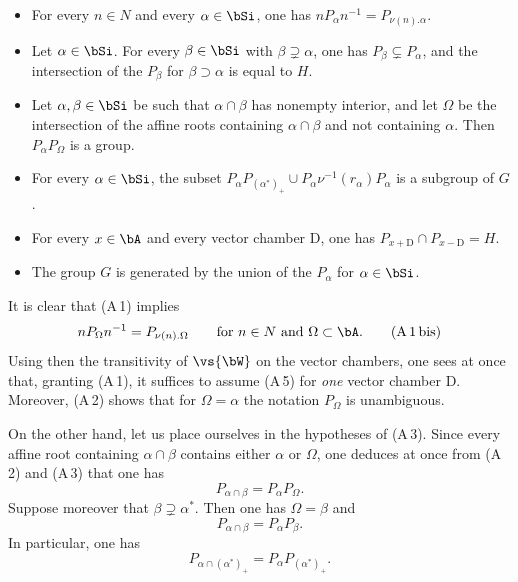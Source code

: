 \documentclass[12pt,a4paper,oneside,english]{smfart}
\makeatletter
\newcommand{\btanchor}[1]{\leavevmode\Hy@raisedlink{\hypertarget{bt:#1}{}}}
\theoremstyle{definition}
\theoremstyle{bt}
\makeatother
\begin{document}
\medskip
\begin{itemize}\itshape
\item[(A\,1)] For every $n\in N$ and every $\alpha\in\bSi$, one has
$nP_{\alpha}n^{-1}=P_{\nu(n).\alpha}$.
\item[(A\,2)] Let $\alpha\in\bSi$. For every $\beta\in\bSi$ with
$\beta\supsetneq\alpha$, one has $P_{\beta}\subsetneq P_{\alpha}$, and the
intersection of the $P_{\beta}$ for $\beta\supset\alpha$ is equal to $H$.
\item[(A\,3)] Let $\alpha,\beta\in\bSi$ be such that $\alpha\cap\beta$ has
nonempty interior, and let $\Omega$ be the intersection of the affine roots
containing $\alpha\cap\beta$ and not containing $\alpha$. Then
$P_{\alpha}P_{\Omega}$ is a group.
\item[(A\,4)] For every $\alpha\in\bSi$, the subset
$P_{\alpha}P_{(\alpha^{*})_{+}}\cup P_{\alpha}\nu^{-1}(r_{\alpha})P_{\alpha}$
is a subgroup of $G$.
\item[(A\,5)] For every $x\in\bA$ and every vector chamber $\mathrm{D}$, one has
$P_{x+\mathrm{D}}\cap P_{x-\mathrm{D}}=H$.
\item[(A\,6)] The group $G$ is generated by the union of the $P_{\alpha}$ for
$\alpha\in\bSi$.
\end{itemize}

\btanchor{5.2.2}
It is clear that (A\,1) implies
\begin{equation*}
nP_{\Omega}n^{-1}=P_{\nu(n).\Omega}\qquad\text{for } n\in N\text{ and }\Omega\subset\bA.
\tag{A\,1\,bis}
\end{equation*}
Using then the transitivity of $\vs{\bW}$ on the vector chambers, one sees at
once that, granting (A\,1), it suffices to assume (A\,5) for \emph{one} vector
chamber $\mathrm{D}$. Moreover, (A\,2) shows that for $\Omega=\alpha$ the
notation $P_{\Omega}$ is unambiguous.

On the other hand, let us place ourselves in the hypotheses of (A\,3). Since
every affine root containing $\alpha\cap\beta$ contains either $\alpha$ or
$\Omega$, one deduces at once from (A\,2) and (A\,3) that one has
\begin{equation*}
P_{\alpha\cap\beta}=P_{\alpha}P_{\Omega}.\tag{1}
\end{equation*}
Suppose moreover that $\beta\supsetneq\alpha^{*}$. Then one has $\Omega=\beta$ and
\begin{equation*}
P_{\alpha\cap\beta}=P_{\alpha}P_{\beta}.\tag{2}
\end{equation*}
In particular, one has
\begin{equation*}
P_{\alpha\cap(\alpha^{*})_{+}}=P_{\alpha}P_{(\alpha^{*})_{+}}.\tag{3}
\end{equation*}
\end{document}
